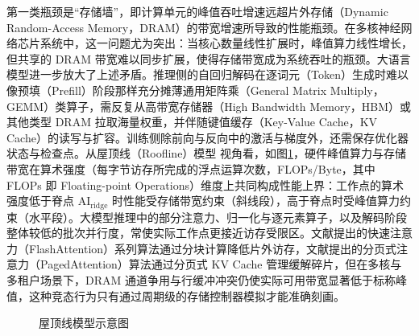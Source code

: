 第一类瓶颈是“存储墙”，即计算单元的峰值吞吐增速远超片外存储（Dynamic Random-Access Memory，DRAM）的带宽增速所导致的性能瓶颈。在多核神经网络芯片系统中，这一问题尤为突出：当核心数量线性扩展时，峰值算力线性增长，但共享的 DRAM 带宽难以同步扩展，使得存储带宽成为系统吞吐的瓶颈\cite{gholami2024aimemorywall}。大语言模型进一步放大了上述矛盾。推理侧的自回归解码在逐词元（Token）生成时难以像预填（Prefill）阶段那样充分摊薄通用矩阵乘（General Matrix Multiply，GEMM）类算子，需反复从高带宽存储器（High Bandwidth Memory，HBM）或其他类型 DRAM 拉取海量权重，并伴随键值缓存（Key-Value Cache，KV Cache）的读写与扩容。训练侧除前向与反向中的激活与梯度外，还需保存优化器状态与检查点。从屋顶线（Roofline）模型\cite{williams2009roofline} 视角看，如图\ref{fig:c1_roofline}，硬件峰值算力与存储带宽在算术强度（每字节访存所完成的浮点运算次数，FLOPs/Byte，其中 FLOPs 即 Floating-point Operations）维度上共同构成性能上界：工作点的算术强度低于脊点 $\mathrm{AI}_\mathrm{ridge}$ 时性能受存储带宽约束（斜线段），高于脊点时受峰值算力约束（水平段）。大模型推理中的部分注意力、归一化与逐元素算子，以及解码阶段整体较低的批次并行度，常使实际工作点更接近访存受限区。文献\parencite{dao2022flashattention,dao2023flashattention2}提出的快速注意力（FlashAttention）系列算法通过分块计算降低片外访存，文献\parencite{kwon2023pagedattention}提出的分页式注意力（PagedAttention）算法通过分页式 KV Cache 管理缓解碎片，但在多核与多租户场景下，DRAM 通道争用与行缓冲冲突仍使实际可用带宽显著低于标称峰值，这种竞态行为只有通过周期级的存储控制器模拟才能准确刻画。

\begin{figure}[htbp]
  \centering
  \caption{屋顶线模型示意图\cite{williams2009roofline}}
  \label{fig:c1_roofline}
\end{figure}

